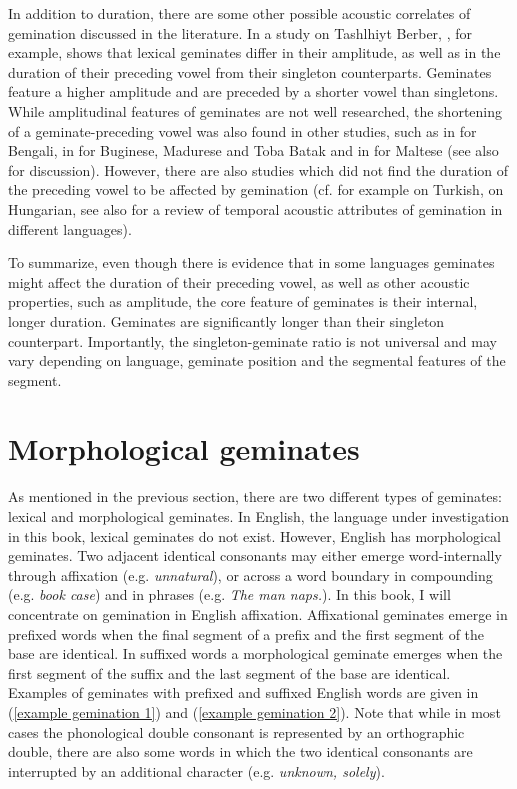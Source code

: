 In addition to duration, there are some other possible acoustic correlates of gemination discussed in the literature. In a study on Tashlhiyt Berber, \cite{Ridouane.2010}, for example, shows  that lexical geminates differ in their  amplitude, as well as in the duration of their preceding vowel from their singleton counterparts. Geminates feature a higher amplitude and are preceded by a shorter vowel than singletons. While amplitudinal features of geminates are not well researched,  the shortening of a geminate-preceding vowel was also found in other studies, such as in \cite{Lahiri.1988} for Bengali, in \cite{Cohn.1999} for Buginese, Madurese and Toba Batak and in  \cite{Galea.2016} for Maltese (see also \citealt{Maddieson.1985} for discussion). However, there are also studies which did not find the duration of the preceding vowel to be affected by gemination (cf. for example \citealt{Lahiri.1988} on Turkish, \citealt{Ham.2001} on Hungarian, see also \citealt[6]{Ridouane.2010} for a review of temporal acoustic attributes of gemination in different languages).

To summarize, even though there is evidence that in some languages geminates might affect the duration of their preceding vowel, as well as other acoustic properties, such as amplitude, the core feature of geminates is their internal, longer duration. Geminates are significantly longer than their singleton counterpart. Importantly, the singleton-geminate ratio is not universal and may vary depending on language, geminate position and the segmental features of the segment.



\section{Morphological geminates}\label{Morphological Gemination}

As mentioned in the previous section, there are two different types of geminates: lexical and morphological geminates. In English, the language under investigation in this book, lexical geminates do not exist. However, English has morphological geminates. Two adjacent identical consonants may either emerge word-internally through affixation (e.g. \textit{unnatural}), or across a word boundary in compounding (e.g. \textit{book case}) and in phrases (e.g. \textit{The man naps.}). In this book, I will concentrate on gemination in English affixation. Affixational geminates emerge in prefixed words when the final segment of a prefix and the first segment of the base are identical. In suffixed words a morphological geminate emerges when the first segment of the suffix and the last segment of the base are identical. Examples of geminates with prefixed and suffixed English words are given in (\ref{example gemination 1}) and (\ref{example gemination 2}). Note that while in most cases the phonological double consonant is represented by an orthographic double, there are also some words in which the two identical consonants are interrupted by  an additional character (e.g. \textit{unknown, solely}).

